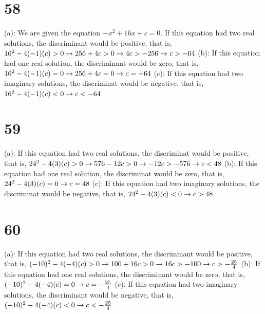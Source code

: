 \documentclass{article}
\theoremstyle{definition}
\begin{document}
\section*{58}
(a): We are given the equation $-x^2+16x+c=0$. If this equation had two real solutions, the discriminant would be positive, that is, 
$16^2-4(-1)(c)>0\newline\rightarrow 
256+4c>0\newline\rightarrow 
4c>-256\newline\rightarrow 
c>-64$\newline 
(b): If this equation had one real solution, the discriminant would be zero, that is, 
$16^2-4(-1)(c)=0\newline\rightarrow 
256+4c=0\newline\rightarrow 
c=-64$\newline
(c): If this equation had two imaginary solutions, the discriminat would be negative, that is, 
$16^2-4(-1)(c)<0\newline\rightarrow 
c<-64$

\section*{59}
(a): If this equation had two real solutions, the discriminat would be positive, that is,
$24^2-4(3)(c)>0\newline\rightarrow 
576-12c>0\newline\rightarrow 
-12c>-576\newline\rightarrow 
c<48$\newline 
(b): If this equation had one real solution, the discriminat would be zero, that is,
$24^2-4(3)(c)=0\newline\rightarrow 
c=48$\newline 
(c): If this equation had two imaginary solutions, the discriminat would be negative, that is,
$24^2-4(3)(c)<0\newline\rightarrow 
c>48$

\section*{60}
(a): If this equation had two real solutions, the discriminant would be positive, that is, 
$(-10)^2-4(-4)(c)>0\newline\rightarrow 
100+16c>0\newline\rightarrow 
16c>-100\newline\rightarrow 
c>-\frac{25}{4}$\newline 
(b): If this equation had one real solutions, the discriminant would be zero, that is, 
$(-10)^2-4(-4)(c)=0\newline\rightarrow 
c=-\frac{25}{4}$\newline 
(c): If this equation had two imaginary solutions, the discriminant would be negative, that is, 
$(-10)^2-4(-4)(c)<0\newline\rightarrow 
c<-\frac{25}{4}$
\end{document}
